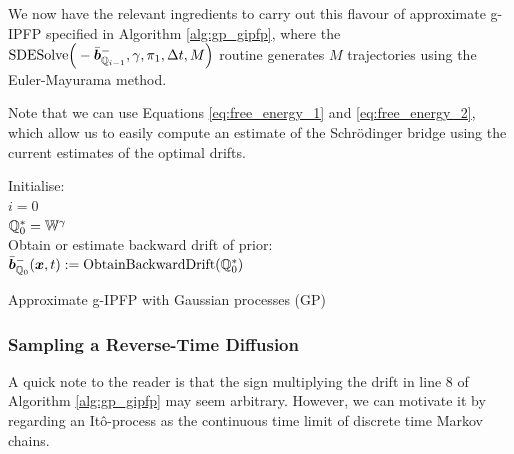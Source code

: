 \documentclass[a4paper,12pt,twoside,openright]{report}
\theoremstyle{definition}
\begin{document}
We now have the relevant ingredients to carry out this flavour of approximate g-IPFP specified in Algorithm  \ref{alg:gp_gipfp}, where the $\text{SDESolve}\Big(-\bar{{\bm{b}}}^{-}_{{\mathbb{Q}}_{i-1}}, \gamma, \pi_1, \Delta t, M\Big)$ routine generates $M$ trajectories using the Euler-Mayurama method.

Note that we can use Equations \ref{eq:free_energy_1} and \ref{eq:free_energy_2}, which allow us to easily compute an estimate of the Schrödinger bridge using the current estimates of the optimal drifts.
\begin{algorithm} \label{alg:gp_gipfp}
Initialise:\\
$i=0$ \\
${\mathbb{Q}}^{*}_0 =\mathbb{W}^{\gamma}$\\
Obtain or estimate backward drift of prior: \\
$\bar{{\bm{b}}}^{-}_{{\mathbb{Q}}_{0}}({\bm{x}}, t) := \text{ObtainBackwardDrift}({\mathbb{Q}}^{*}_0)$\\

\caption{ Approximate g-IPFP with Gaussian processes (GP)   }
\end{algorithm}



\subsubsection{Sampling a Reverse-Time Diffusion }
A quick note to the reader is that the sign multiplying the drift in line $8$ of Algorithm \ref{alg:gp_gipfp} may seem arbitrary. However, we can motivate it by regarding an Itô-process as the continuous time limit of discrete time Markov chains.
\end{document}
